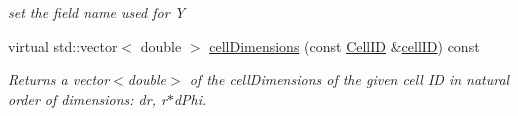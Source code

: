 \begin{DoxyCompactItemize}
\begin{DoxyCompactList}\small\item\em set the field name used for Y \end{DoxyCompactList}\item 
virtual std\+::vector$<$ double $>$ \hyperlink{class_d_d4hep_1_1_d_d_segmentation_1_1_polar_grid_r_phi2_a64bcce17716dee34c3f648954a1ec830}{cell\+Dimensions} (const \hyperlink{namespace_d_d4hep_1_1_d_d_segmentation_ac7af071d85cb48820914434a07e21ba1}{Cell\+ID} \&\hyperlink{class_d_d4hep_1_1_d_d_segmentation_1_1_polar_grid_r_phi2_a173f2b845ff7871249b2a8dcf70f3ab1}{cell\+ID}) const
\begin{DoxyCompactList}\small\item\em Returns a vector$<$double$>$ of the cell\+Dimensions of the given cell ID in natural order of dimensions\+: dr, r$\ast$d\+Phi. \end{DoxyCompactList}\end{DoxyCompactItemize}

